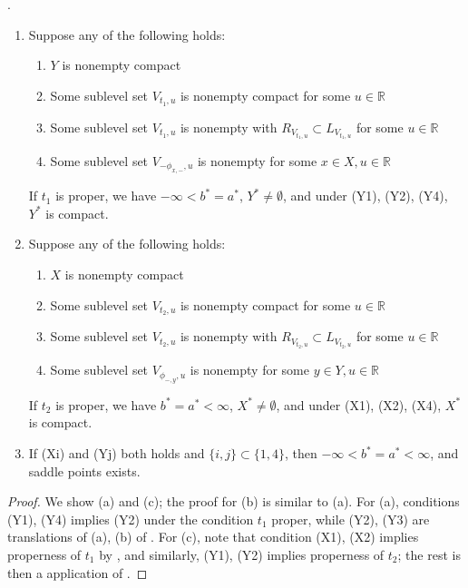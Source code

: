 \begin{prop}\label{prop:047-saddle-point-theorem}.
	\begin{enumerate}[label=(\alph*)]
		\item Suppose any of the following holds:
		      \begin{enumerate}[label=(Y\arabic*)]
			      \item $Y$ is nonempty compact
			      \item Some sublevel set $V_{t_1,u}$ is nonempty compact for some $u\in \mathbb{R}$
			      \item Some sublevel set $V_{t_1,u}$ is nonempty with $R_{V_{t_1,u}}\subset L_{V_{t_1,u}}$ for some $u\in \mathbb{R}$
			      \item Some sublevel set $V_{-\phi_{x,-},u}$ is nonempty for some $x\in X,u\in \mathbb{R}$
		      \end{enumerate}
		      If $t_1$ is proper, we have $-\infty<b^\ast=a^\ast$, $Y^\ast\neq\emptyset$, and under (Y1), (Y2), (Y4), $Y^\ast$ is compact.
		\item Suppose any of the following holds:
		      \begin{enumerate}[label=(X\arabic*)]
			      \item $X$ is nonempty compact
			      \item Some sublevel set $V_{t_2,u}$ is nonempty compact for some $u\in \mathbb{R}$
			      \item Some sublevel set $V_{t_2,u}$ is nonempty with $R_{V_{t_2,u}}\subset L_{V_{t_2,u}}$ for some $u\in \mathbb{R}$
			      \item Some sublevel set $V_{\phi_{-,y},u}$ is nonempty for some $y\in Y,u\in \mathbb{R}$
		      \end{enumerate}
		      If $t_2$ is proper, we have $b^\ast=a^\ast<\infty$, $X^\ast\neq\emptyset$, and under (X1), (X2), (X4), $X^\ast$ is compact.
		\item If (Xi) and (Yj) both holds and $\{i,j\}\subset \{1,4\}$, then $-\infty<b^\ast=a^\ast<\infty$, and saddle points exists.
	\end{enumerate}
\end{prop}
\begin{proof}
	We show (a) and (c); the proof for (b) is similar to (a). For (a), conditions (Y1), (Y4) implies (Y2) under the condition $t_1$ proper, while (Y2), (Y3) are translations of (a), (b) of . For (c), note that condition (X1), (X2) implies properness of $t_1$ by , and similarly, (Y1), (Y2) implies properness of $t_2$; the rest is then a application of .
\end{proof}

